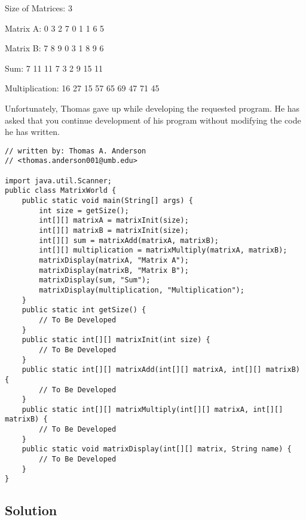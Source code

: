 \newpage

\renewcommand{\lstlistingname}{Figure}
\begin{terminal}
Size of Matrices: 3

Matrix A:
  0   3   2
  7   0   1
  1   6   5

Matrix B:
  7   8   9
  0   3   1
  8   9   6

Sum:
  7  11  11
  7   3   2
  9  15  11

Multiplication:
 16  27  15
 57  65  69
 47  71  45
\end{terminal}

Unfortunately, Thomas gave up while developing the requested program.
He has asked that you continue development of his program without modifying the code he has written.

\lstset{caption=}
\lstset{language=Java,tabsize=4}
\begin{lstlisting}
// written by: Thomas A. Anderson
// <thomas.anderson001@umb.edu>

import java.util.Scanner;
public class MatrixWorld {
	public static void main(String[] args) {
		int size = getSize();
		int[][] matrixA = matrixInit(size);
		int[][] matrixB = matrixInit(size);
		int[][] sum = matrixAdd(matrixA, matrixB);
		int[][] multiplication = matrixMultiply(matrixA, matrixB);
		matrixDisplay(matrixA, "Matrix A");
		matrixDisplay(matrixB, "Matrix B");
		matrixDisplay(sum, "Sum");
		matrixDisplay(multiplication, "Multiplication");
	}
	public static int getSize() {
		// To Be Developed
	}
	public static int[][] matrixInit(int size) {
		// To Be Developed
	}
	public static int[][] matrixAdd(int[][] matrixA, int[][] matrixB) {
		// To Be Developed
	}
	public static int[][] matrixMultiply(int[][] matrixA, int[][] matrixB) {
		// To Be Developed
	}
	public static void matrixDisplay(int[][] matrix, String name) {
		// To Be Developed
	}
}
\end{lstlisting}

\subsection*{Solution}

